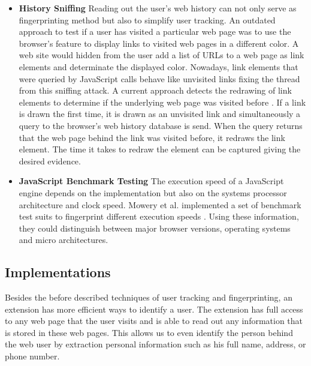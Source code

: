 \begin{itemize}
		\item \textbf{History Sniffing} Reading out the user's web history can not only serve as fingerprinting method but also to simplify user tracking. An outdated approach to test if a user has visited a particular web page was to use the browser's feature to display links to visited web pages in a different color. A web site would hidden from the user add a list of URLs to a web page as link elements and determinate the displayed color. Nowadays, link elements that were queried by JavaScript calls behave like unvisited links fixing the thread from this sniffing attack. A current approach detects the redrawing of link elements to determine if the underlying web page was visited before \cite{paulstone_historysniffing}. If a link is drawn the first time, it is drawn as an unvisited link and simultaneously a query to the browser's web history database is send. When the query returns that the web page behind the link was visited before, it redraws the link element. The time it takes to redraw the element can be captured giving the desired evidence.
		
		\item \textbf{JavaScript Benchmark Testing} The execution speed of a JavaScript engine depends on the implementation but also on the systems processor architecture and clock speed. Mowery et al. implemented a set of benchmark test suits to fingerprint different execution speeds \cite{MBYS11}. Using these information, they could distinguish between major browser versions, operating systems and micro architectures. 
	\end{itemize}	

	

\subsection{Implementations}
	
	Besides the before described techniques of user tracking and fingerprinting, an extension has more efficient ways to identify a user. The extension has full access to any web page that the user visits and is able to read out any information that is stored in these web pages. This allows us to even identify the person behind the web user by extraction personal information such as his full name, address, or phone number. 
	
